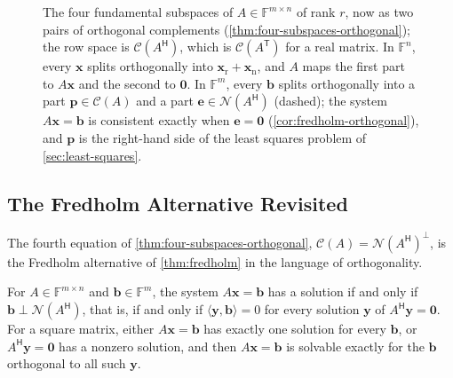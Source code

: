 \begin{figure}
\caption{The four fundamental subspaces of $A\in\mathbb F^{m\times n}$ of rank $r$, now as two pairs of orthogonal complements (\cref{thm:four-subspaces-orthogonal}); the row space is $\mathcal C(A^{\mathsf H})$, which is $\mathcal C(A^{\mathsf T})$ for a real matrix. In $\mathbb F^n$, every $\mathbf x$ splits orthogonally into $\mathbf x_{\mathrm r}+\mathbf x_{\mathrm n}$, and $A$ maps the first part to $A\mathbf x$ and the second to $\mathbf 0$. In $\mathbb F^m$, every $\mathbf b$ splits orthogonally into a part $\mathbf p\in\mathcal C(A)$ and a part $\mathbf e\in\mathcal N(A^{\mathsf H})$ (dashed); the system $A\mathbf x=\mathbf b$ is consistent exactly when $\mathbf e=\mathbf 0$ (\cref{cor:fredholm-orthogonal}), and $\mathbf p$ is the right-hand side of the least squares problem of \cref{sec:least-squares}.\label{fig:four-subspaces-orthogonal}}
\end{figure}

\subsection{The Fredholm Alternative Revisited}

The fourth equation of \cref{thm:four-subspaces-orthogonal}, $\mathcal C(A)=\mathcal N(A^{\mathsf H})^\perp$, is the Fredholm alternative of \cref{thm:fredholm} in the language of orthogonality.

\begin{corollary}
\label{cor:fredholm-orthogonal}
For $A\in\mathbb F^{m\times n}$ and $\mathbf b\in\mathbb F^m$, the system $A\mathbf x=\mathbf b$ has a solution if and only if $\mathbf b\perp\mathcal N(A^{\mathsf H})$, that is, if and only if $\langle\mathbf y,\mathbf b\rangle=0$ for every solution $\mathbf y$ of $A^{\mathsf H}\mathbf y=\mathbf 0$. For a square matrix, either $A\mathbf x=\mathbf b$ has exactly one solution for every $\mathbf b$, or $A^{\mathsf H}\mathbf y=\mathbf 0$ has a nonzero solution, and then $A\mathbf x=\mathbf b$ is solvable exactly for the $\mathbf b$ orthogonal to all such $\mathbf y$.
\end{corollary}

